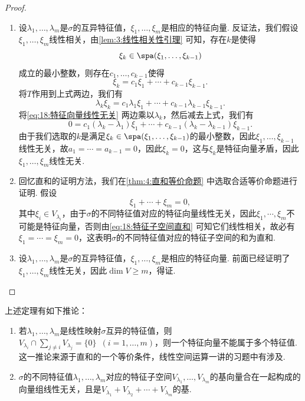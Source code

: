 \begin{proof}
    \begin{enumerate}
        \item 设$\lambda_1,\ldots,\lambda_m$是$\sigma$的互异特征值，$\xi_1,\ldots,\xi_m$是相应的特征向量. 反证法，我们假设$\xi_1,\ldots,\xi_m$线性相关，由\autoref{lem:3:线性相关性引理} 可知，存在$k$是使得
              \[\xi_k\in\spa(\xi_1,\ldots,\xi_{k-1})\]
              成立的最小整数，则存在$c_1,\ldots,c_{k-1}$使得
              \begin{equation*}\label{eq:18:特征向量线性无关}
                  \xi_k=c_1\xi_1+\cdots+c_{k-1}\xi_{k-1}.
              \end{equation*}
              将$T$作用到上式两边，我们有
              \[\lambda_k\xi_k=c_1\lambda_1\xi_1+\cdots+c_{k-1}\lambda_{k-1}\xi_{k-1}.\]
              将\autoref{eq:18:特征向量线性无关} 两边乘以$\lambda_k$，然后减去上式，我们有
              \[0=c_1(\lambda_k-\lambda_1)\xi_1+\cdots+c_{k-1}(\lambda_k-\lambda_{k-1})\xi_{k-1}.\]
              由于我们选取的$k$是满足$\xi_k\in\spa(\xi_1,\ldots,\xi_{k-1})$的最小整数，因此$\xi_1,\ldots,\xi_{k-1}$线性无关，故$a_1=\cdots=a_{k-1}=0$，因此$\xi_k=0$，这与$\xi_k$是特征向量矛盾，因此$\xi_1,\ldots,\xi_m$线性无关.

        \item 回忆直和的证明方法，我们在\autoref{thm:4:直和等价命题} 中选取合适等价命题进行证明. 假设
              \begin{equation}\label{eq:18:特征子空间直和}
                  \xi_1+\cdots+\xi_m=0,
              \end{equation}
              其中$\xi_i\in V_{\lambda_i}$，由于$\sigma$的不同特征值对应的特征向量线性无关，因此$\xi_1,\cdots,\xi_m$不可能是特征向量，否则由\autoref{eq:18:特征子空间直和} 可知它们线性相关，故必有$\xi_1=\cdots=\xi_m=0$，这表明$\sigma$的不同特征值对应的特征子空间的和为直和.

        \item 设$\lambda_1,\ldots,\lambda_m$是$\sigma$的互异特征值，$\xi_1,\ldots,\xi_m$是相应的特征向量. 前面已经证明了$\xi_1,\ldots,\xi_m$线性无关，因此$\dim V\geqslant m$，得证.
    \end{enumerate}
\end{proof}

上述定理有如下推论：
\begin{enumerate}
    \item 若$\lambda_1,\ldots,\lambda_m$是线性映射$\sigma$互异的特征值，则$V_{\lambda_i}\cap\sum\limits_{j\neq i}V_{\lambda_j}=\{0\}
              \enspace(i=1,\ldots,m)$，则一个特征向量不能属于多个特征值. 这一推论来源于直和的一个等价条件，线性空间运算一讲的习题中有涉及.

    \item $\sigma$的不同特征值$\lambda_1,\ldots,\lambda_m$对应的特征子空间$V_{\lambda_1},\ldots,V_{\lambda_m}$的基向量合在一起构成的向量组线性无关，且是$V_{\lambda_1}+V_{\lambda_2}+\cdots+V_{\lambda_m}$的基.
\end{enumerate}

